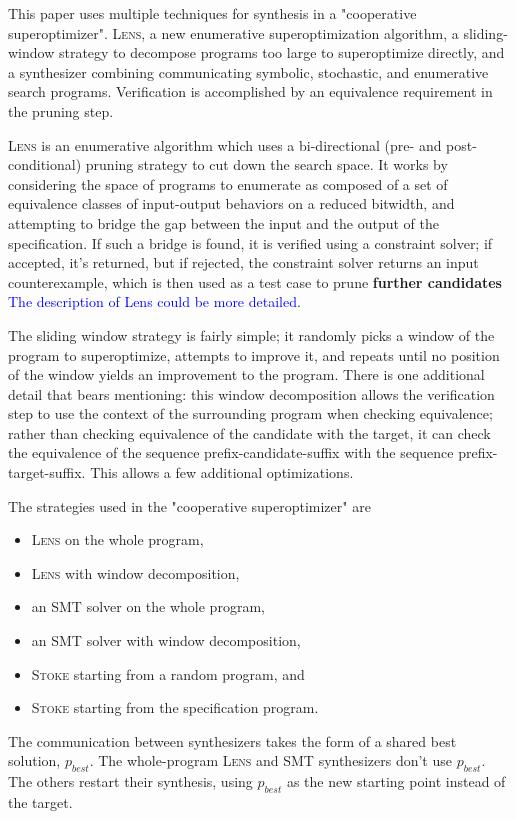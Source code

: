 \documentclass[12pt,twoside]{reedthesis}
\newcommand{\comment}[2]{\textbf{#1} \textcolor{blue}{#2}}
\begin{document}
This paper uses multiple techniques for synthesis in a "cooperative superoptimizer".
\textsc{Lens}, a new enumerative superoptimization algorithm,
a sliding-window strategy to decompose programs too large to superoptimize directly,
and a synthesizer combining communicating symbolic, stochastic, and enumerative search programs.
Verification is accomplished by an equivalence requirement in the pruning step.
    
\textsc{Lens} is an enumerative algorithm which uses a bi-directional (pre- and post-conditional) pruning strategy to cut down the search space.
It works by considering the space of programs to enumerate as composed of a set of equivalence classes of input-output behaviors on a reduced bitwidth, and attempting to bridge the gap between the input and the output of the specification.
If such a bridge is found, it is verified using a constraint solver;
        if accepted, it's returned,
        but if rejected, the constraint solver returns an input counterexample,
    which is then used as a test case to prune
    \comment{further candidates}{The description of Lens could be more detailed}.

The sliding window strategy is fairly simple; it randomly picks a window of the program to superoptimize, attempts to improve it, and repeats until no position of the window yields an improvement to the program.
There is one additional detail that bears mentioning: 
    this window decomposition allows the verification step to use the context of the surrounding program when checking equivalence;
    rather than checking equivalence of the candidate with the target, it can check the equivalence of the sequence prefix-candidate-suffix with the sequence prefix-target-suffix.
This allows a few additional optimizations.

The strategies used in the "cooperative superoptimizer" are
\begin{itemize}
    \item \textsc{Lens} on the whole program,
    \item \textsc{Lens} with window decomposition,
    \item an SMT solver on the whole program,
    \item an SMT solver with window decomposition,
    \item \textsc{Stoke} starting from a random program, and
    \item \textsc{Stoke} starting from the specification program.
\end{itemize}
The communication between synthesizers takes the form of a shared best solution, $p_{best}$.
The whole-program \textsc{Lens} and SMT synthesizers don't use $p_{best}$. The others restart their synthesis, using $p_{best}$ as the new starting point instead of the target.
\end{document}
